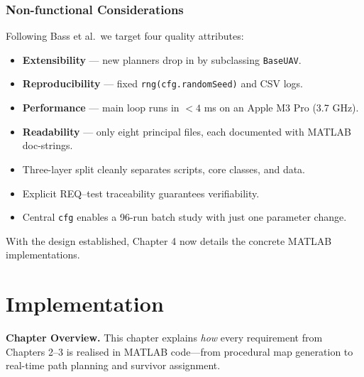 \documentclass[12pt,a4paper]{report}
\begin{document}


\subsection{Non-functional Considerations}
\label{subsec:nonfunctional}

Following Bass et al.\,\cite{Bass2012SoftwareArch} we target four quality attributes:
\begin{itemize}[leftmargin=1.5em]
  \item \textbf{Extensibility} — new planners drop in by subclassing \texttt{BaseUAV}.
  \item \textbf{Reproducibility} — fixed \texttt{rng(cfg.randomSeed)} and CSV logs.
  \item \textbf{Performance} — main loop runs in \(<\!4\) ms on an Apple M3 Pro (3.7 GHz).
  \item \textbf{Readability} — only eight principal files, each documented with MATLAB doc-strings.
\end{itemize}

\begin{tcolorbox}[colback=gray!10,title=\textbf{Take-away 3.1}]
\begin{itemize}[leftmargin=1.2em]
  \item Three-layer split cleanly separates scripts, core classes, and data.
  \item Explicit REQ–test traceability guarantees verifiability.
  \item Central \texttt{cfg} enables a 96-run batch study with just one parameter change.
\end{itemize}
\end{tcolorbox}

\vspace{0.5em}
With the design established, Chapter 4 now details the concrete MATLAB
implementations.
\chapter{Implementation}
\label{cha:implementation}

\textbf{Chapter Overview.}
This chapter explains \emph{how} every requirement from Chapters 2–3 is realised in
MATLAB code—from procedural map generation to real-time path planning and survivor
assignment.
\end{document}

